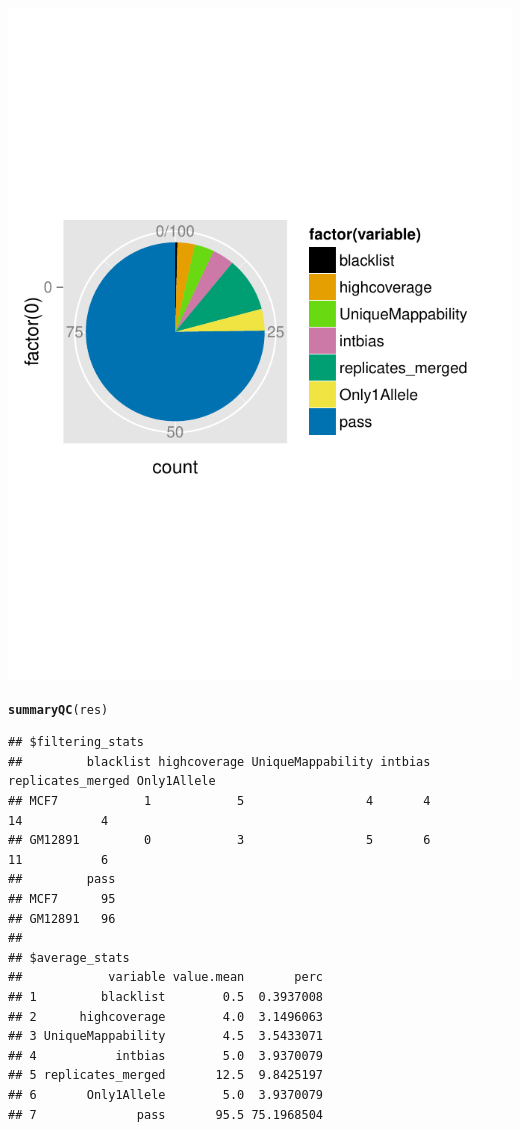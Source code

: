 \documentclass{article}\usepackage[]{graphicx}\usepackage[usenames,dvipsnames]{color}
\makeatletter
\def\maxwidth{ %
  \ifdim\Gin@nat@width>\linewidth
    \linewidth
  \else
    \Gin@nat@width
  \fi
}
\newcommand{\hlstd}[1]{\textcolor[rgb]{0.345,0.345,0.345}{#1}}%
\newcommand{\hlkwd}[1]{\textcolor[rgb]{0.737,0.353,0.396}{\textbf{#1}}}%
\newenvironment{kframe}{%
 \def\at@end@of@kframe{}%
 \ifinner\ifhmode%
  \def\at@end@of@kframe{\end{minipage}}%
  \begin{minipage}{\columnwidth}%
 \fi\fi%
 \def\FrameCommand##1{\hskip\@totalleftmargin \hskip-\fboxsep
 \colorbox{shadecolor}{##1}\hskip-\fboxsep
     \hskip-\linewidth \hskip-\@totalleftmargin \hskip\columnwidth}%
 \MakeFramed {\advance\hsize-\width
   \@totalleftmargin\z@ \linewidth\hsize
   \@setminipage}}%
 {\par\unskip\endMakeFramed%
 \at@end@of@kframe}
\newenvironment{knitrout}{}{} %
\makeatother
\begin{document}
\begin{knitrout}
{\centering \includegraphics[width=\maxwidth]{figure/QCplots-3} 

}


\begin{kframe}\begin{alltt}
\hlkwd{summaryQC}\hlstd{(res)}
\end{alltt}
\begin{verbatim}
## $filtering_stats
##         blacklist highcoverage UniqueMappability intbias replicates_merged Only1Allele
## MCF7            1            5                 4       4                14           4
## GM12891         0            3                 5       6                11           6
##         pass
## MCF7      95
## GM12891   96
## 
## $average_stats
##            variable value.mean       perc
## 1         blacklist        0.5  0.3937008
## 2      highcoverage        4.0  3.1496063
## 3 UniqueMappability        4.5  3.5433071
## 4           intbias        5.0  3.9370079
## 5 replicates_merged       12.5  9.8425197
## 6       Only1Allele        5.0  3.9370079
## 7              pass       95.5 75.1968504
\end{verbatim}
\end{kframe}
\end{knitrout}
\end{document}
